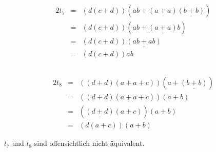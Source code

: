 \documentclass[10pt,a4paper,oneside,ngerman,numbers=noenddot]{scrartcl}
\begin{document}
\section{} %
    \subsection{} %
        \begin{alignat*}{2}
            t_7 &=& (d(c + d))(ab + (a + a)\underline{(b + b)}) \\
            &=& (d(c + d))(ab + \underline{(a + a)}b) \\
            &=& (d(c + d))\underline{(ab + ab)} \\
            &=& (d(c + d))ab
        \end{alignat*}

    \subsection{}
        \begin{alignat*}{2}
            t_8 &=& ((d + d)(a + a + c))(a + \underline{(b + b)}) \\
            &=& ((d + d)(\underline{a + a} + c))(a + b) \\
            &=& (\underline{(d + d)}(a + c))(a + b) \\
            &=& (d(a + c))(a + b)
        \end{alignat*}

        \(t_7\) und \(t_8\) sind offensichtlich nicht äquivalent. %
\end{document}
